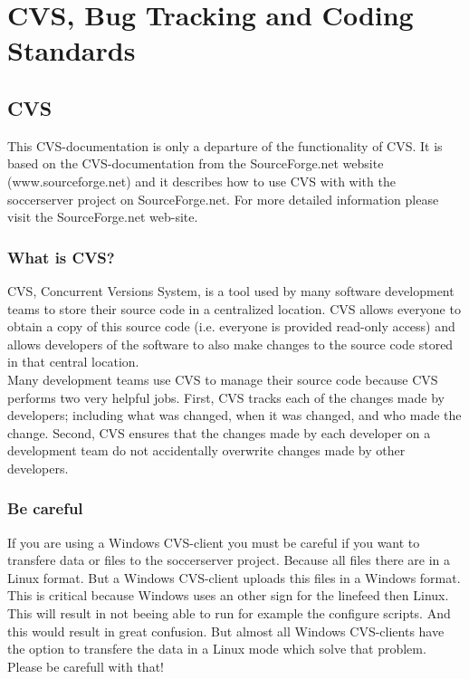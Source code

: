 
\chapter{CVS, Bug Tracking and Coding Standards}


\section{CVS}

This CVS-documentation is only a departure of the functionality of CVS. It is based on the CVS-documentation from the SourceForge.net website (www.sourceforge.net) and it describes how to use CVS with with the soccerserver project on SourceForge.net. For more detailed information please visit the SourceForge.net web-site.

\subsection{What is CVS?}

CVS, Concurrent Versions System, is a tool used by many software development teams to store their source code in a centralized location. CVS allows everyone to obtain a copy of this source code (i.e. everyone is provided read-only access) and allows developers of the software to also make changes to the source code stored in that central location.\\

Many development teams use CVS to manage their source code because CVS performs two very helpful jobs. First, CVS tracks each of the changes made by developers; including what was changed, when it was changed, and who made the change. Second, CVS ensures that the changes made by each developer on a development team do not accidentally overwrite changes made by other developers.

\subsection{Be careful}

If you are using a Windows CVS-client you must be careful if you want to transfere data or files to the soccerserver project. Because all files there are in a Linux format. But a Windows CVS-client uploads this files in a Windows format. This is critical because Windows uses an other sign for the linefeed then Linux. This will result in not beeing able to run for example the configure scripts. And this would result in great confusion.
But almost all Windows CVS-clients have the option to transfere the data in a Linux mode which solve that problem. Please be carefull with that!

